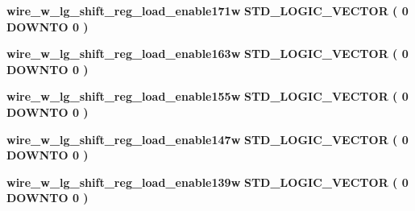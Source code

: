 \begin{DoxyCompactItemize}
\item 
{\bf wire\+\_\+w\+\_\+lg\+\_\+shift\+\_\+reg\+\_\+load\+\_\+enable171w} {\bfseries \textcolor{comment}{S\+T\+D\+\_\+\+L\+O\+G\+I\+C\+\_\+\+V\+E\+C\+T\+OR}\textcolor{vhdlchar}{ }\textcolor{vhdlchar}{(}\textcolor{vhdlchar}{ }\textcolor{vhdlchar}{ } \textcolor{vhdldigit}{0} \textcolor{vhdlchar}{ }\textcolor{keywordflow}{D\+O\+W\+N\+TO}\textcolor{vhdlchar}{ }\textcolor{vhdlchar}{ } \textcolor{vhdldigit}{0} \textcolor{vhdlchar}{ }\textcolor{vhdlchar}{)}\textcolor{vhdlchar}{ }} 
\item 
{\bf wire\+\_\+w\+\_\+lg\+\_\+shift\+\_\+reg\+\_\+load\+\_\+enable163w} {\bfseries \textcolor{comment}{S\+T\+D\+\_\+\+L\+O\+G\+I\+C\+\_\+\+V\+E\+C\+T\+OR}\textcolor{vhdlchar}{ }\textcolor{vhdlchar}{(}\textcolor{vhdlchar}{ }\textcolor{vhdlchar}{ } \textcolor{vhdldigit}{0} \textcolor{vhdlchar}{ }\textcolor{keywordflow}{D\+O\+W\+N\+TO}\textcolor{vhdlchar}{ }\textcolor{vhdlchar}{ } \textcolor{vhdldigit}{0} \textcolor{vhdlchar}{ }\textcolor{vhdlchar}{)}\textcolor{vhdlchar}{ }} 
\item 
{\bf wire\+\_\+w\+\_\+lg\+\_\+shift\+\_\+reg\+\_\+load\+\_\+enable155w} {\bfseries \textcolor{comment}{S\+T\+D\+\_\+\+L\+O\+G\+I\+C\+\_\+\+V\+E\+C\+T\+OR}\textcolor{vhdlchar}{ }\textcolor{vhdlchar}{(}\textcolor{vhdlchar}{ }\textcolor{vhdlchar}{ } \textcolor{vhdldigit}{0} \textcolor{vhdlchar}{ }\textcolor{keywordflow}{D\+O\+W\+N\+TO}\textcolor{vhdlchar}{ }\textcolor{vhdlchar}{ } \textcolor{vhdldigit}{0} \textcolor{vhdlchar}{ }\textcolor{vhdlchar}{)}\textcolor{vhdlchar}{ }} 
\item 
{\bf wire\+\_\+w\+\_\+lg\+\_\+shift\+\_\+reg\+\_\+load\+\_\+enable147w} {\bfseries \textcolor{comment}{S\+T\+D\+\_\+\+L\+O\+G\+I\+C\+\_\+\+V\+E\+C\+T\+OR}\textcolor{vhdlchar}{ }\textcolor{vhdlchar}{(}\textcolor{vhdlchar}{ }\textcolor{vhdlchar}{ } \textcolor{vhdldigit}{0} \textcolor{vhdlchar}{ }\textcolor{keywordflow}{D\+O\+W\+N\+TO}\textcolor{vhdlchar}{ }\textcolor{vhdlchar}{ } \textcolor{vhdldigit}{0} \textcolor{vhdlchar}{ }\textcolor{vhdlchar}{)}\textcolor{vhdlchar}{ }} 
\item 
{\bf wire\+\_\+w\+\_\+lg\+\_\+shift\+\_\+reg\+\_\+load\+\_\+enable139w} {\bfseries \textcolor{comment}{S\+T\+D\+\_\+\+L\+O\+G\+I\+C\+\_\+\+V\+E\+C\+T\+OR}\textcolor{vhdlchar}{ }\textcolor{vhdlchar}{(}\textcolor{vhdlchar}{ }\textcolor{vhdlchar}{ } \textcolor{vhdldigit}{0} \textcolor{vhdlchar}{ }\textcolor{keywordflow}{D\+O\+W\+N\+TO}\textcolor{vhdlchar}{ }\textcolor{vhdlchar}{ } \textcolor{vhdldigit}{0} \textcolor{vhdlchar}{ }\textcolor{vhdlchar}{)}\textcolor{vhdlchar}{ }} 

\end{DoxyCompactItemize}
